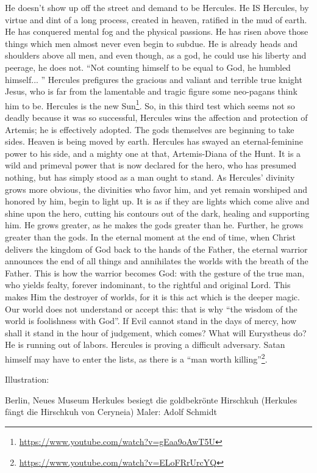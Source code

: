He doesn't show up off the street and demand to be Hercules. He IS Hercules, by virtue and dint of a long process, created in heaven, ratified in the mud of earth. He has conquered mental fog and the physical passions. He has risen above those things which men almost never even begin to subdue. He is already heads and shoulders above all men, and even though, as a god, he could use his liberty and peerage, he does not. ``Not counting himself to be equal to God, he humbled himself... '' Hercules prefigures the gracious and valiant and terrible true knight Jesus, who is far from the lamentable and tragic figure some neo-pagans think him to be. Hercules is the new Sun\footnote{\url{https://www.youtube.com/watch?v=gEaa9oAwT5U}}. So, in this third test which seems not so deadly because it was so successful, Hercules wins the affection and protection of Artemis; he is effectively adopted. The gods themselves are beginning to take sides. Heaven is being moved by earth. Hercules has swayed an eternal-feminine power to his side, and a mighty one at that, Artemis-Diana of the Hunt. It is a wild and primeval power that is now declared for the hero, who has presumed nothing, but has simply stood as a man ought to stand. As Hercules' divinity grows more obvious, the divinities who favor him, and yet remain worshiped and honored by him, begin to light up. It is as if they are lights which come alive and shine upon the hero, cutting his contours out of the dark, healing and supporting him. He grows greater, as he makes the gods greater than he. Further, he grows greater than the gods. In the eternal moment at the end of time, when Christ delivers the kingdom of God back to the hands of the Father, the eternal warrior announces the end of all things and annihilates the worlds with the breath of the Father. This is how the warrior becomes God: with the gesture of the true man, who yields fealty, forever indominant, to the rightful and original Lord. This makes Him the destroyer of worlds, for it is this act which is the deeper magic. Our world does not understand or accept this: that is why ``the wisdom of the world is foolishness with God''. If Evil cannot stand in the days of mercy, how shall it stand in the hour of judgement, which comes? What will Eurystheus do? He is running out of labors. Hercules is proving a difficult adversary. Satan himself may have to enter the lists, as there is a ``man worth killing''\footnote{\url{https://www.youtube.com/watch?v=ELoFRrUrcYQ}}.

Illustration:

Berlin, Neues Museum Herkules besiegt die goldbekrönte Hirschkuh (Herkules fängt die Hirschkuh von Ceryneia) Maler: Adolf Schmidt 

